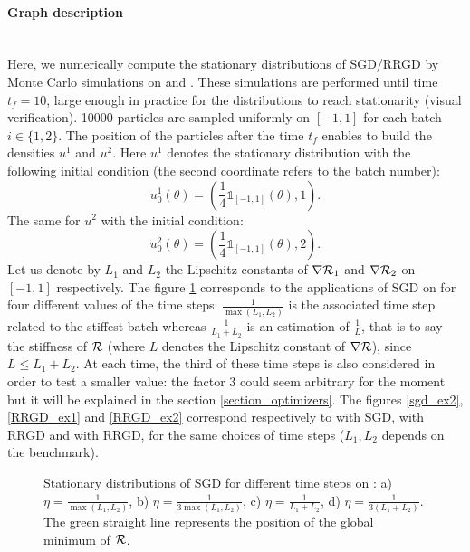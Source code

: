\paragraph{Graph description}
~~\\
Here, we numerically compute the stationary distributions of SGD/RRGD by Monte Carlo simulations on \exOne and \exTwo. These simulations are performed until time $t_f=10$, large
enough in practice for the distributions to reach stationarity (visual verification). 10000 particles are sampled uniformly on $[-1,1]$ for each batch $i\in \{1,2\}$. The position of the particles after the time $t_f$ enables to build the densities $u^1$ and $u^2$. Here $u^1$ denotes the stationary distribution with the following initial condition (the second coordinate refers to the batch number):
\begin{equation*}
	u^1_0(\theta) = \left(\frac{1}{4} \mathds{1}_{[-1,1]}(\theta),1\right).
\end{equation*}
The same for $u^2$ with the initial condition:
\begin{equation*}
	u^2_0(\theta) = \left(\frac{1}{4} \mathds{1}_{[-1,1]}(\theta),2\right).
\end{equation*}
Let us denote by $L_1$ and $L_2$ the Lipschitz constants of $\nabla \mathcal{R}_1$ and $\nabla \mathcal{R}_2$ on $[-1,1]$ respectively. The figure \ref{sgd_ex1} corresponds to the applications of SGD on \exOne
for four different values of the time steps: $\frac{1}{\max(L_1,L_2)}$ is the associated time step related to the stiffest batch whereas $\frac{1}{L_1+L_2}$ is an estimation of
$\frac{1}{L}$, that is to say the stiffness of $\mathcal{R}$ (where $L$ denotes the Lipschitz constant of $\nabla \mathcal{R}$), since $L \leq L_1+L_2$. At each time, the third of these time steps is also
considered in order to test a smaller value: the factor 3 could seem arbitrary for the moment but it will be explained in the section \ref{section_optimizers}. The figures
\ref{sgd_ex2}, \ref{RRGD_ex1} and \ref{RRGD_ex2} correspond respectively to \exTwo with SGD, \exOne with RRGD and \exTwo with RRGD, for the same choices of time steps ($L_1,L_2$ depends on the benchmark). 

\begin{figure}[!h]
	\centering
	\scalebox{0.45}{}
	\caption{Stationary distributions of SGD for different time steps on \exOne: a) $\eta=\frac{1}{\max(L_1,L_2)}$, b) $\eta=\frac{1}{3\max(L_1,L_2)}$, c) $\eta=\frac{1}{L_1+L_2}$, d) $\eta=\frac{1}{3(L_1+L_2)}$. The green straight line represents the position of the global minimum of $\mathcal{R}$.}
	\label{sgd_ex1}
\end{figure}

